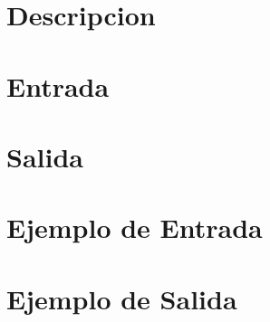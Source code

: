 \documentclass{article}
\begin{document}
\section*{Descripcion}

\section*{Entrada}

\section*{Salida}

\section*{Ejemplo de Entrada}
\texttt{}
\section*{Ejemplo de Salida}
\texttt{}
\end{document}
